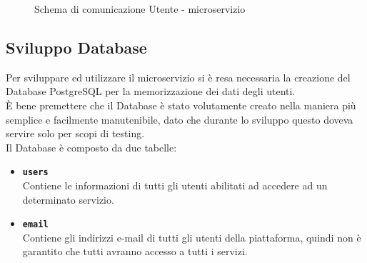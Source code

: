 \begin{figure}[ht]
	\centering
	\caption{Schema di comunicazione Utente - microservizio}
	\label{fig:one}
\end{figure}
\newpage
\subsection{Sviluppo Database}\label{sec:sviluppodatabase}
Per sviluppare ed utilizzare il microservizio si è resa necessaria la creazione del Database PostgreSQL per la memorizzazione dei dati degli utenti.\\
È bene premettere che il Database è stato volutamente creato nella maniera più semplice e facilmente manutenibile, dato che durante lo sviluppo questo doveva 
servire solo per scopi di testing.\\
Il Database è composto da due tabelle:
\begin{itemize}
		\item \textbf{\texttt{users}}\\ Contiene le informazioni di tutti gli utenti abilitati ad accedere ad un determinato servizio.
		\item \textbf{\texttt{email}}\\ Contiene gli indirizzi e-mail di tutti gli utenti della piattaforma, quindi non è garantito che tutti avranno accesso a tutti i servizi.
\end{itemize}
